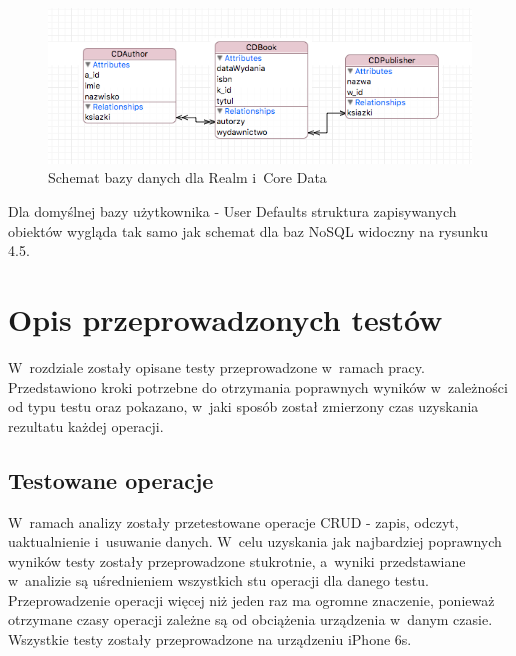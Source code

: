 \begin{figure}[h]
\centering
	\includegraphics[width=\linewidth]{img/database/document-sheme.png}
	\caption{Schemat bazy danych dla Realm i~Core Data}
	\label{fig: nosql_data_scheme}
\end{figure}

Dla domyślnej bazy użytkownika - User Defaults struktura zapisywanych obiektów wygląda tak samo jak schemat dla baz NoSQL widoczny na rysunku 4.5. \par 

\section{Opis przeprowadzonych testów}

 W~rozdziale zostały opisane testy przeprowadzone w~ramach pracy. Przedstawiono kroki potrzebne do otrzymania poprawnych wyników w~zależności od typu testu oraz pokazano, w~jaki sposób został zmierzony czas uzyskania rezultatu każdej operacji. 

\subsection{Testowane operacje}

 W~ramach analizy zostały przetestowane operacje CRUD - zapis, odczyt, uaktualnienie i~usuwanie danych. W~celu uzyskania jak najbardziej poprawnych wyników testy zostały przeprowadzone stukrotnie, a~wyniki przedstawiane w~analizie są uśrednieniem wszystkich stu operacji dla danego testu. Przeprowadzenie operacji więcej niż jeden raz ma ogromne znaczenie, ponieważ otrzymane czasy operacji zależne są od obciążenia urządzenia w~danym czasie. Wszystkie testy zostały przeprowadzone na  urządzeniu iPhone 6s. \par

